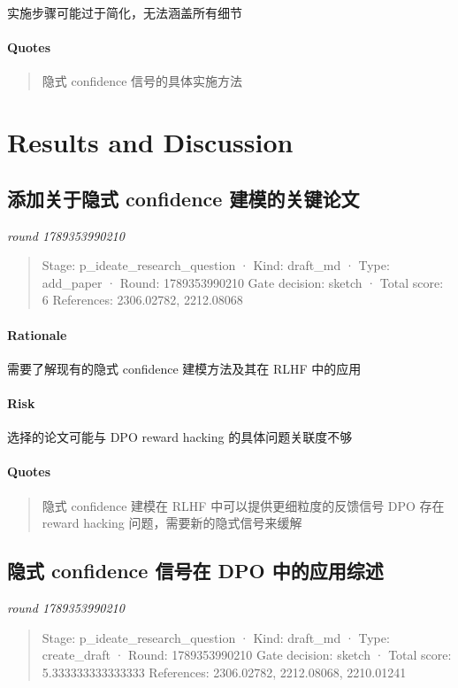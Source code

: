 \documentclass{article}
\begin{document}
实施步骤可能过于简化，无法涵盖所有细节

\paragraph{Quotes}
\begin{quote}
隐式 confidence 信号的具体实施方法
\end{quote}

\section{Results and Discussion}
\subsection{添加关于隐式 confidence 建模的关键论文}
\textit{round 1789353990210}\\
\begin{quote}
Stage: p\_ideate\_research\_question  ·  Kind: draft\_md  ·  Type: add\_paper  ·  Round: 1789353990210
Gate decision: sketch  ·  Total score: 6
References: 2306.02782, 2212.08068
\end{quote}

\paragraph{Rationale}

需要了解现有的隐式 confidence 建模方法及其在 RLHF 中的应用

\paragraph{Risk}

选择的论文可能与 DPO reward hacking 的具体问题关联度不够

\paragraph{Quotes}
\begin{quote}
隐式 confidence 建模在 RLHF 中可以提供更细粒度的反馈信号
DPO 存在 reward hacking 问题，需要新的隐式信号来缓解
\end{quote}

\subsection{隐式 confidence 信号在 DPO 中的应用综述}
\textit{round 1789353990210}\\
\begin{quote}
Stage: p\_ideate\_research\_question  ·  Kind: draft\_md  ·  Type: create\_draft  ·  Round: 1789353990210
Gate decision: sketch  ·  Total score: 5.333333333333333
References: 2306.02782, 2212.08068, 2210.01241
\end{quote}
\end{document}
